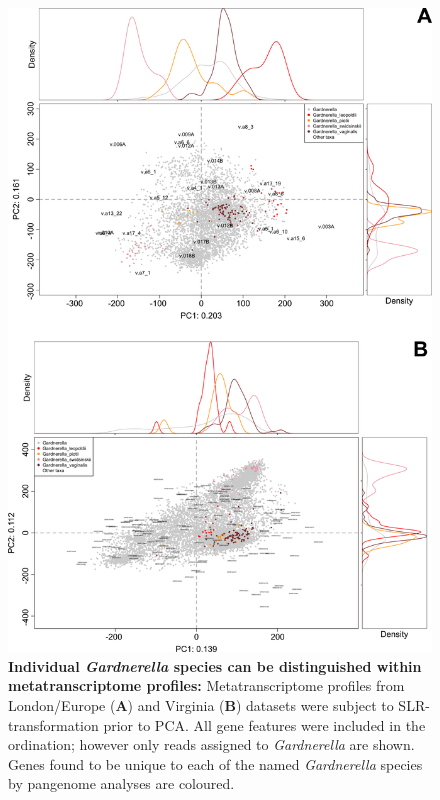 \documentclass[sn-mathphys,Numbered]{sn-jnl}%
\begin{document}
\begin{figure}[H]
    \centering
    \includegraphics[scale = 0.725]{0_supplFig4.png}
    \caption{\textbf{Individual \textit{Gardnerella} species can be distinguished within metatranscriptome profiles:} Metatranscriptome profiles from London/Europe (\textbf{A}) and Virginia (\textbf{B}) datasets were subject to SLR-transformation prior to PCA. All gene features were included in the ordination; however only reads assigned to \textit{Gardnerella} are shown. Genes found to be unique to each of the named \textit{Gardnerella} species by pangenome analyses are coloured.} \label{fig:sfigGVbiplots}
\end{figure}
\newpage
\end{document}

